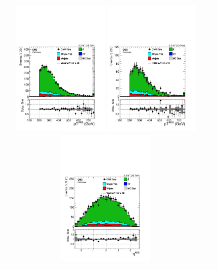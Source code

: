  \begin{figure}[htbp]
 \centering
 \begin{tabular}{cc}
 \includegraphics[width=0.45\textwidth]{chapters/Chapter8-EventSelection/Figures/WVanalysis/ControlPlots_TTbar/mu/ungroomed_jet_pt_0}
 \includegraphics[width=0.45\textwidth]{chapters/Chapter8-EventSelection/Figures/WVanalysis/ControlPlots_TTbar/el/ungroomed_jet_pt_0}\\
 \includegraphics[width=0.45\textwidth]{chapters/Chapter8-EventSelection/Figures/WVanalysis/ControlPlots_TTbar/mu/ungroomed_jet_eta_0}

\end{tabular}
\end{figure}
